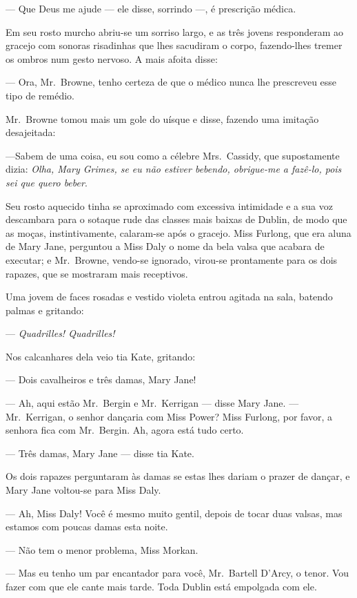 --- Que Deus me ajude --- ele disse, sorrindo ---, é prescrição médica.

Em seu rosto murcho abriu-se um sorriso largo, e as três jovens responderam ao
gracejo com sonoras risadinhas que lhes sacudiram o corpo, fazendo-lhes tremer
os ombros num gesto nervoso.  A mais afoita disse:

--- Ora, Mr.~Browne, tenho certeza de que o médico nunca lhe prescreveu esse
tipo de remédio.

Mr.~Browne tomou mais um gole do uísque e disse, fazendo uma imitação
desajeitada:

---Sabem de uma coisa, eu sou como a célebre Mrs.~Cassidy, que supostamente
dizia: \textit{Olha, Mary Grimes, se eu não estiver bebendo,
obrigue-me a fazê-lo, pois sei que quero beber}.

Seu rosto aquecido tinha se aproximado com excessiva intimidade e a sua voz
descambara para o sotaque rude das classes mais baixas de Dublin, de modo que
as moças, instintivamente, calaram-se após o gracejo.  Miss Furlong, que era
aluna de Mary Jane, perguntou a Miss Daly o nome da bela valsa que acabara de
executar; e Mr.~Browne, vendo-se ignorado, virou-se prontamente para os dois
rapazes, que se mostraram mais receptivos.

Uma jovem de faces rosadas e vestido violeta entrou agitada na sala, batendo
palmas e gritando:

--- \textit{Quadrilles!  Quadrilles!}

Nos calcanhares dela veio tia Kate, gritando:

--- Dois cavalheiros e três damas, Mary Jane!

--- Ah, aqui estão Mr.~Bergin e Mr.~Kerrigan --- disse Mary Jane.  --- 
Mr.~Kerrigan, o senhor dançaria com Miss Power?  Miss Furlong, por favor, a senhora
fica com Mr.~Bergin.  Ah, agora está tudo certo.

--- Três damas, Mary Jane --- disse tia Kate.

Os dois rapazes perguntaram às damas se estas lhes dariam o prazer de dançar, e
Mary Jane voltou-se para Miss Daly.

--- Ah, Miss Daly!  Você é mesmo muito gentil, depois de tocar duas valsas, mas
estamos com poucas damas esta noite.

--- Não tem o menor problema, Miss Morkan.

--- Mas eu tenho um par encantador para você, Mr.~Bartell D’Arcy, o tenor.  Vou
fazer com que ele cante mais tarde.  Toda Dublin está empolgada com ele.

